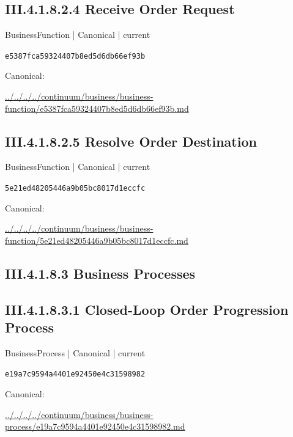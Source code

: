 \documentclass[10pt,a4paper]{article}
\begin{document}
\subsection*{III.4.1.8.2.4 Receive Order Request}
\label{element-e5387fca59324407b8ed5d6db66ef93b}
{\small BusinessFunction | Canonical | current}\par
\texttt{e5387fca59324407b8ed5d6db66ef93b}\par
Canonical: \par
{\footnotesize\url{../../../../continuum/business/business-function/e5387fca59324407b8ed5d6db66ef93b.md}}\par
\subsection*{III.4.1.8.2.5 Resolve Order Destination}
\label{element-5e21ed48205446a9b05bc8017d1eccfc}
{\small BusinessFunction | Canonical | current}\par
\texttt{5e21ed48205446a9b05bc8017d1eccfc}\par
Canonical: \par
{\footnotesize\url{../../../../continuum/business/business-function/5e21ed48205446a9b05bc8017d1eccfc.md}}\par
\subsection*{III.4.1.8.3 Business Processes}
\subsection*{III.4.1.8.3.1 Closed-Loop Order Progression Process}
\label{element-e19a7c9594a4401e92450e4c31598982}
{\small BusinessProcess | Canonical | current}\par
\texttt{e19a7c9594a4401e92450e4c31598982}\par
Canonical: \par
{\footnotesize\url{../../../../continuum/business/business-process/e19a7c9594a4401e92450e4c31598982.md}}\par
\end{document}
